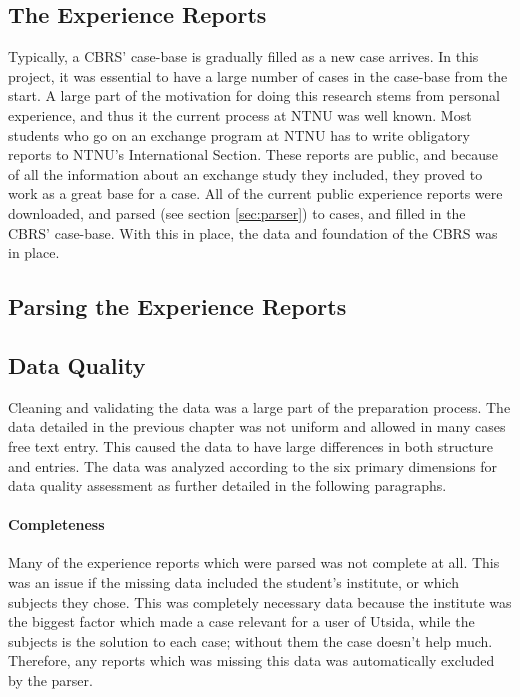 \subsection{The Experience Reports}\label{sec:experience_reports}
Typically, a CBRS' case-base is gradually filled as a new case arrives. In this project, it was essential to have a large number of cases in the case-base from the start. A large part of the motivation for doing this research stems from personal experience, and thus it the current process at NTNU was well known. Most students who go on an exchange program at NTNU has to write obligatory reports to NTNU's International Section. These reports are public, and because of all the information about an exchange study they included, they proved to work as a great base for a case. All of the current public experience reports were downloaded, and parsed (see section \ref{sec:parser}) to cases, and filled in the CBRS' case-base. With this in place, the data and foundation of the CBRS was in place.

\subsection{Parsing the Experience Reports}

\subsection{Data Quality}
Cleaning and validating the data was a large part of the preparation process. The data detailed in the previous chapter was not uniform and allowed in many cases free text entry. This caused the data to have large differences in both structure and entries. The data was analyzed according to the six primary dimensions for data quality assessment\cite{askham2013six} as further detailed in the following paragraphs.

\paragraph{Completeness}
Many of the experience reports which were parsed was not complete at all. This was an issue if the missing data included the student's institute, or which subjects they chose. This was completely necessary data because the institute was the biggest factor which made a case relevant for a user of Utsida, while the subjects is the solution to each case; without them the case doesn't help much. Therefore, any reports which was missing this data was automatically excluded by the parser.


